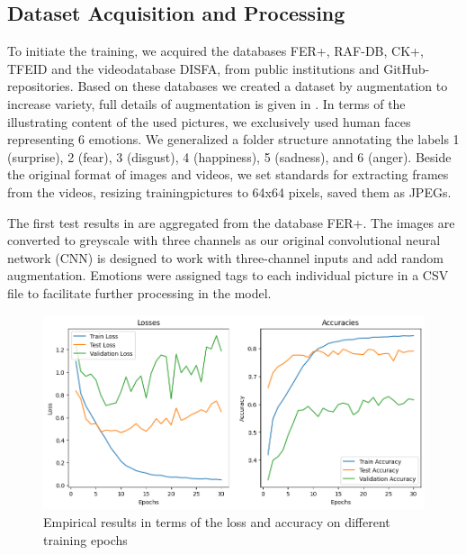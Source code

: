 \subsection{Dataset Acquisition and Processing}
\label{sec:datasets}
To initiate the training, 
we acquired the databases FER+\cite{barsoum_training_2016}, RAF-DB\cite{li2019reliable}, CK+\cite{5543262}, TFEID\cite{tfeid} and the videodatabase DISFA\cite{6475933}, from public institutions and GitHub-repositories.
Based on these databases we created a dataset by augmentation to increase variety, 
full details of augmentation is given in . 
In terms of the illustrating content of the used pictures, we exclusively used human faces representing 6 emotions. We generalized a folder structure annotating the labels 1 (surprise), 2 (fear), 3 (disgust), 4 (happiness), 5 (sadness), and 6 (anger). 
Beside the original format of images and videos, we set standards for extracting frames from the videos, resizing trainingpictures to 64x64 pixels, saved them as JPEGs.

The first test results in  are aggregated from the database FER+. The images are converted to greyscale with three channels as our original convolutional neural network (CNN) is designed to work with three-channel inputs and add random augmentation. Emotions were assigned tags to each individual picture in a CSV file to facilitate further processing in the model.

\begin{figure}[ht]
  \centering
   \includegraphics[width=\linewidth]{output.png}
   \caption{Empirical results in terms of the loss and accuracy on different training epochs}
   \label{fig:result}
\end{figure}

